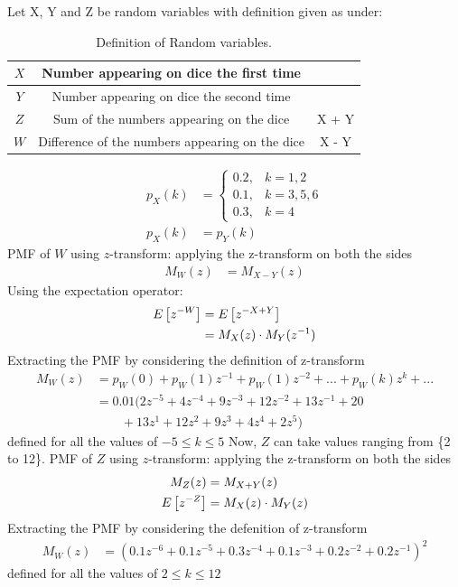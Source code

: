 \documentclass[]{article}
\begin{document}
\solution
Let X, Y and Z be random variables with definition given as under:
\begin{table}[H]
\centering
\begin{tabular}{|c|c|c|}
    \hline
    $X$ & Number appearing on dice the first time & \\
    \hline
    $Y$ & Number appearing on dice the second time & \\
    \hline
    $Z$ & Sum of the numbers appearing on the dice & X + Y\\
    \hline
    $W$ & Difference of the numbers appearing on the dice & X - Y\\
    \hline
\end{tabular}
\label{tab:ncert/12/13/3/1/}
\caption{Definition of Random variables.}
\end{table}
\begin{align}
p_X(k) &= 
	\begin{cases}
		0.2, & k = 1,2 \\
		0.1, & k = 3,5,6 \\
		0.3, & k = 4
	\end{cases}\\
	p_X(k) &= p_Y(k) 
\end{align}
PMF of $W$ using $z$-transform:
applying the z-transform on both the sides
\begin{align}
	M_W(z) &= M_{X-Y}(z)
\end{align}
Using the expectation operator:
\begin{align}
	E{}\left[z^{-W}\right] &= E{}\left[z^{-X+Y}\right]\\
	&= M_X(z)\cdot M_Y(z^{-1})
\end{align}
Extracting the PMF by considering the definition of z-transform
\begin{align}
	M_W(z) &= p_W(0) +p_W(1)z^{-1} +p_W(1)z^{-2} + ... + p_W(k)z^k + ...\\
	&= 0.01(2z^{-5}+4z^{-4}+9z^{-3}+12z^{-2}+13z^{-1}+20\nonumber\\&\qquad+13z^{1}+12z^{2}+9z^{3}+4z^{4}+2z^{5})
\end{align}
defined for all the values of $-5 \leq k\leq 5$
Now,
$Z$ can take values ranging from \{2 to 12\}.
PMF of $Z$ using $z$-transform:
applying the z-transform on both the sides
\begin{align}
	M_Z(z) &= M_{X+Y}(z) \\
	E{}\left[z^{-Z}\right] &= M_X(z)\cdot M_Y(z)
\end{align}
Extracting the PMF by considering the defenition of z-transform
\begin{align}
	M_W(z) &= (0.1z^{-6}+0.1z^{-5}+0.3z^{-4}+0.1z^{-3}+0.2z^{-2}+0.2z^{-1})^2
\end{align}
defined for all the values of $2 \leq k\leq 12$
\end{document}

